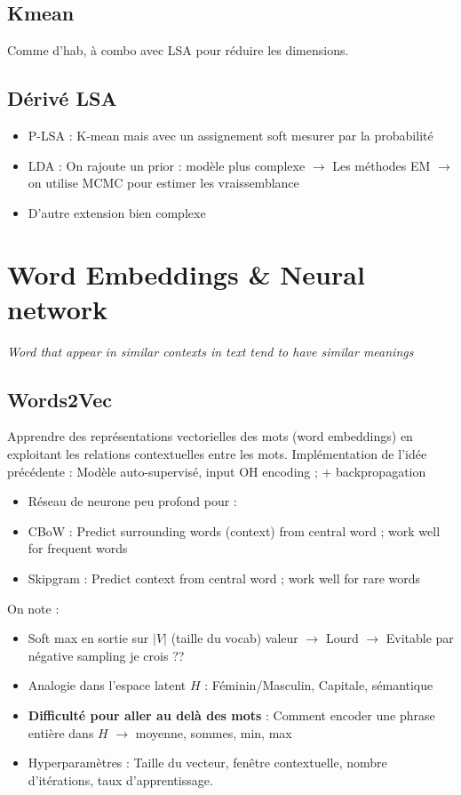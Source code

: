 \documentclass{article}
\begin{document}
\begin{multicols}{2}
    \subsection{Kmean}
    Comme d'hab, à combo avec LSA pour réduire les dimensions. 
    \subsection{Dérivé LSA}
    \begin{itemize}
        \item P-LSA : K-mean mais avec un assignement soft mesurer par la probabilité
        \item LDA : On rajoute un prior : modèle plus complexe $\rightarrow$ Les méthodes EM  $\rightarrow$ on utilise MCMC pour estimer les vraissemblance
        \item D'autre extension bien complexe
    \end{itemize}
    
    
    
    
    
    \section{Word Embeddings \& Neural network}
    {\large \begin{center}
    \textit{Word that appear in similar contexts in text tend to have similar meanings}
    \end{center}}
    
    \subsection{Words2Vec}
    Apprendre des représentations vectorielles des mots (word embeddings) en exploitant les relations contextuelles entre les mots.
    Implémentation de l'idée précédente : Modèle auto-supervisé, input OH encoding ; + backpropagation 
    \begin{itemize}
        \item Réseau de neurone peu profond pour :
        \item CBoW : Predict surrounding words (context) from central word ; work well for frequent words
        \item Skipgram : Predict context from central word ; work well for rare words
    \end{itemize}
    On note : \begin{itemize}
        \item Soft max en sortie sur $ \left| V \right|  $ (taille du vocab) valeur $\rightarrow$ Lourd $\rightarrow$ Evitable par négative sampling je crois ??
        \item Analogie dans l'espace latent $ H $ : Féminin/Masculin, Capitale, sémantique 
        \item \textbf{Difficulté pour aller au delà des mots} : Comment encoder une phrase entière dans $H$ $\rightarrow$ moyenne, sommes, min, max
        \item Hyperparamètres : Taille du vecteur, fenêtre contextuelle, nombre d'itérations, taux d'apprentissage.
    \end{itemize}
    

\end{multicols}
\end{document}
